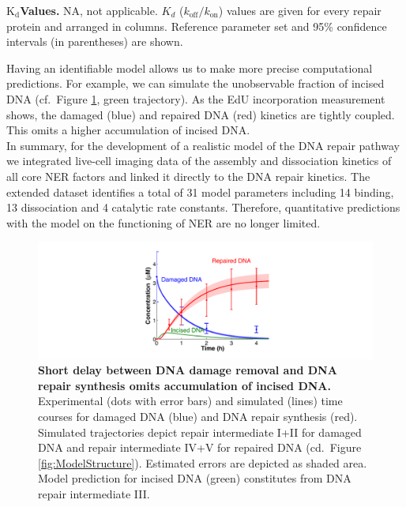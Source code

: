 \begin{landscape}
\begin{table}[t]
\begin{adjustwidth}{-1.1 cm}{}
\captionsetup{width=1.24\textwidth}
\caption{\textbf{$\text{K}_{\text{d}}$Values.} NA, not applicable. $K_d$ ($k_{\text{off}}/k_{\text{on}}$) values are given for every repair protein and arranged in columns. Reference parameter set and 95\% confidence intervals (in parentheses) are shown.}\label{tab:KdValues}
\end{adjustwidth}
\end{table}

\end{landscape}

Having an identifiable model allows us to make more precise computational predictions. For example, we can simulate the unobservable fraction of incised DNA (cf.\ Figure \ref{fig:ModelFit_intermed}, green trajectory). As the EdU incorporation measurement shows, the damaged (blue) and repaired DNA (red) kinetics are tightly coupled. This omits a higher accumulation of incised DNA.\\ 


In summary, for the development of a realistic model of the DNA repair pathway we integrated live-cell imaging data of the assembly and dissociation kinetics of all core NER factors and linked it directly to the DNA repair kinetics. The extended dataset identifies a total of 31 model parameters including 14 binding, 13 dissociation and 4 catalytic rate constants. Therefore, quantitative predictions with the model on the functioning of NER are no longer limited.  

\begin{figure}[htbp]
	\begin{center}
		\includegraphics[width=1\textwidth]{Abbildungen/figure2_7.pdf}
		\caption{\textbf{Short delay between DNA damage removal and DNA repair synthesis omits accumulation of incised DNA.} Experimental (dots with error bars) and simulated (lines) time courses for damaged DNA (blue) and DNA repair synthesis (red). Simulated trajectories depict repair intermediate I+II for damaged DNA and repair intermediate IV+V for repaired DNA (cd.\ Figure \ref{fig:ModelStructure}). Estimated errors are depicted as shaded area. Model prediction for incised DNA (green) constitutes from DNA repair intermediate III. }
		\label{fig:ModelFit_intermed}
	\end{center}
\end{figure}

